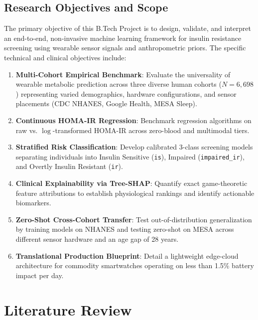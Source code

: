 \documentclass[12pt,a4paper,oneside]{report}
\begin{document}
\section{Research Objectives and Scope}
The primary objective of this B.Tech Project is to design, validate, and interpret an end-to-end, non-invasive machine learning framework for insulin resistance screening using wearable sensor signals and anthropometric priors. The specific technical and clinical objectives include:
\begin{enumerate}
    \item \textbf{Multi-Cohort Empirical Benchmark}: Evaluate the universality of wearable metabolic prediction across three diverse human cohorts ($N = 6,698$) representing varied demographics, hardware configurations, and sensor placements (CDC NHANES, Google Health, MESA Sleep).
    \item \textbf{Continuous HOMA-IR Regression}: Benchmark regression algorithms on raw vs. $\log$-transformed HOMA-IR across zero-blood and multimodal tiers.
    \item \textbf{Stratified Risk Classification}: Develop calibrated 3-class screening models separating individuals into Insulin Sensitive (\texttt{is}), Impaired (\texttt{impaired\_ir}), and Overtly Insulin Resistant (\texttt{ir}).
    \item \textbf{Clinical Explainability via Tree-SHAP}: Quantify exact game-theoretic feature attributions to establish physiological rankings and identify actionable biomarkers.
    \item \textbf{Zero-Shot Cross-Cohort Transfer}: Test out-of-distribution generalization by training models on NHANES and testing zero-shot on MESA across different sensor hardware and an age gap of 28 years.
    \item \textbf{Translational Production Blueprint}: Detail a lightweight edge-cloud architecture for commodity smartwatches operating on less than 1.5\% battery impact per day.
\end{enumerate}

\chapter{Literature Review}
\end{document}
